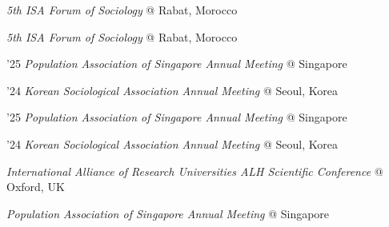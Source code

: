\begin{aka}
    \item [2025]
    \begin{akb}
        \item \textit{5th ISA Forum of Sociology} @ Rabat, Morocco
    \end{akb}

    \item [2025]
    \begin{akb}
        \item \textit{5th ISA Forum of Sociology} @ Rabat, Morocco
    \end{akb}

    \item [2024--2025]
    \begin{akb}
    \item '25 \textit{Population Association of Singapore Annual Meeting} @ Singapore
    \item '24 \textit{Korean Sociological Association Annual Meeting} @ Seoul, Korea
     \end{akb}

    \item [2024--2025]
    \begin{akb}
    \item '25 \textit{Population Association of Singapore Annual Meeting} @ Singapore
    \item '24 \textit{Korean Sociological Association Annual Meeting} @ Seoul, Korea
     \end{akb}

    \item [2024]
    \begin{akb}
    \item \textit{International Alliance of Research Universities ALH Scientific Conference} @ Oxford, UK
    \item \textit{Population Association of Singapore Annual Meeting} @ Singapore
    \end{akb}


\end{aka}
